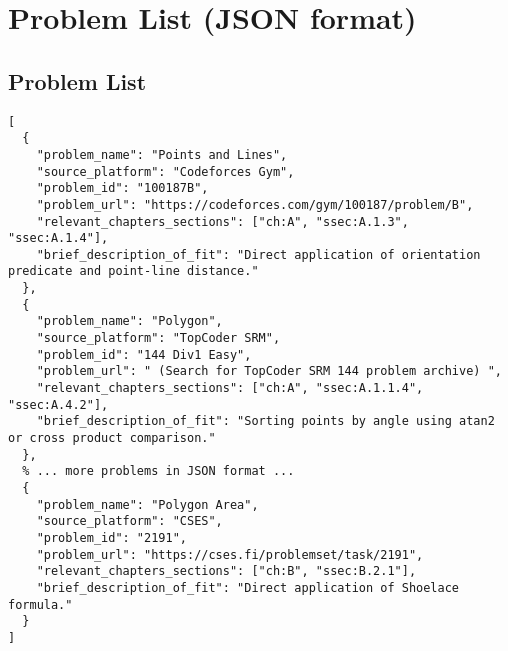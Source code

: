 \chapter{Problem List (JSON format)}
\label{ch:AppendixB}


\section*{Problem List} %
\label{sec:AppB.problems} %

\begin{verbatim}
[
  {
    "problem_name": "Points and Lines",
    "source_platform": "Codeforces Gym",
    "problem_id": "100187B",
    "problem_url": "https://codeforces.com/gym/100187/problem/B",
    "relevant_chapters_sections": ["ch:A", "ssec:A.1.3", "ssec:A.1.4"],
    "brief_description_of_fit": "Direct application of orientation predicate and point-line distance."
  },
  {
    "problem_name": "Polygon",
    "source_platform": "TopCoder SRM",
    "problem_id": "144 Div1 Easy",
    "problem_url": " (Search for TopCoder SRM 144 problem archive) ",
    "relevant_chapters_sections": ["ch:A", "ssec:A.1.1.4", "ssec:A.4.2"],
    "brief_description_of_fit": "Sorting points by angle using atan2 or cross product comparison."
  },
  % ... more problems in JSON format ...
  {
    "problem_name": "Polygon Area",
    "source_platform": "CSES",
    "problem_id": "2191",
    "problem_url": "https://cses.fi/problemset/task/2191",
    "relevant_chapters_sections": ["ch:B", "ssec:B.2.1"],
    "brief_description_of_fit": "Direct application of Shoelace formula."
  }
]
\end{verbatim}
